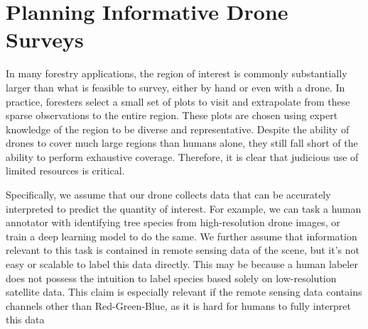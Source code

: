 \section{Planning Informative Drone Surveys}

In many forestry applications, the region of interest is commonly substantially larger than what is feasible to survey, either by hand or even with a drone. In practice, foresters  select a small set of plots to visit and extrapolate from these sparse observations to the entire region. These plots are chosen using expert knowledge of the region to be diverse and representative. Despite the ability of drones to cover much large regions than humans alone, they still fall short of the ability to perform  exhaustive coverage. Therefore, it is clear that judicious use of limited resources is critical.


Specifically, we assume that our drone collects data that can be accurately interpreted to predict the quantity of interest. For example, we can task a human annotator with identifying tree species from high-resolution drone images, or train a deep learning model to do the same. We further assume that information relevant to this task is contained in remote sensing data of the scene, but it's not easy or scalable to label this data directly. This may be because a human labeler does not possess the intuition to label species based solely on low-resolution satellite data. This claim is especially relevant if the remote sensing data contains channels other than Red-Green-Blue, as it is hard for humans to fully interpret this data 

